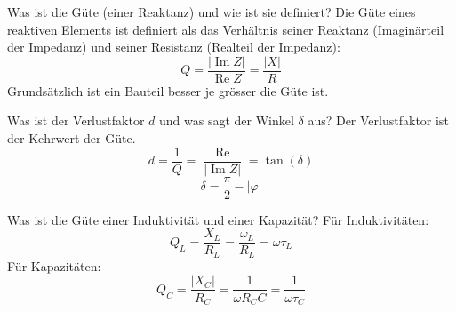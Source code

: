 
\begin{karte}{Was ist die Güte (einer Reaktanz) und wie ist sie definiert?}
	Die Güte eines reaktiven Elements ist definiert als das Verhältnis seiner Reaktanz (Imaginärteil der Impedanz) und seiner Resistanz (Realteil der Impedanz):\\
	\begin{equation*}
		Q=\frac{|\operatorname{Im} Z|}{\operatorname{Re} Z}=\frac{|X|}{R}
	\end{equation*}
	Grundsätzlich ist ein Bauteil besser je grösser die Güte ist.
\end{karte}

\begin{karte}{Was ist der Verlustfaktor $d$ und was sagt der Winkel $\delta$ aus?}
	Der Verlustfaktor ist der Kehrwert der Güte.
	\begin{equation*}
		d = \frac{1}{Q} = \frac{\operatorname{Re}}{|\operatorname{Im} Z|} = \tan (\delta)
	\end{equation*}
	\begin{equation*}
		\delta = \frac{\pi}{2} - \left|\varphi\right|
	\end{equation*}
\end{karte}

\begin{karte}{Was ist die Güte einer Induktivität und einer Kapazität?}
	Für Induktivitäten:
	\begin{equation*}
		Q_L = \frac{X_L}{R_L} = \frac{\omega_L}{R_L} = \omega \tau_L
	\end{equation*}
	Für Kapazitäten:
	\begin{equation*}
		Q_C = \frac{|X_C|}{R_C} = \frac{1}{\omega R_C C} = \frac{1}{\omega \tau_C}
	\end{equation*}
\end{karte}